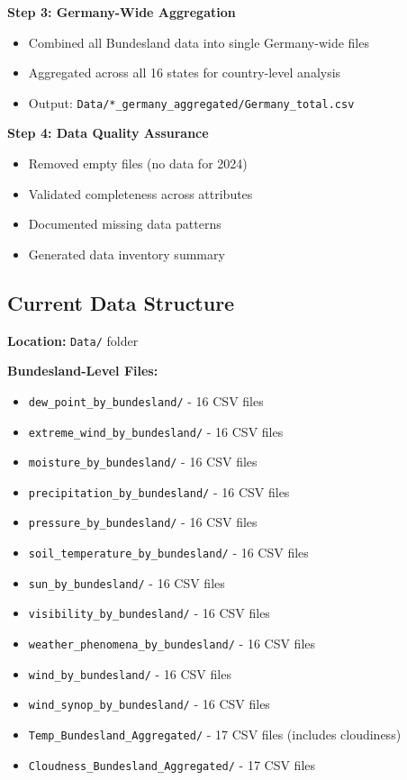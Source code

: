 \documentclass[11pt,a4paper]{article}
\begin{document}
\textbf{Step 3: Germany-Wide Aggregation}
\begin{itemize}
    \item Combined all Bundesland data into single Germany-wide files
    \item Aggregated across all 16 states for country-level analysis
    \item Output: \texttt{Data/*\_germany\_aggregated/Germany\_total.csv}
\end{itemize}

\textbf{Step 4: Data Quality Assurance}
\begin{itemize}
    \item Removed empty files (no data for 2024)
    \item Validated completeness across attributes
    \item Documented missing data patterns
    \item Generated data inventory summary
\end{itemize}

\subsection{Current Data Structure}

\textbf{Location:} \texttt{Data/} folder

\textbf{Bundesland-Level Files:}
\begin{itemize}
    \item \texttt{dew\_point\_by\_bundesland/} - 16 CSV files
    \item \texttt{extreme\_wind\_by\_bundesland/} - 16 CSV files
    \item \texttt{moisture\_by\_bundesland/} - 16 CSV files
    \item \texttt{precipitation\_by\_bundesland/} - 16 CSV files
    \item \texttt{pressure\_by\_bundesland/} - 16 CSV files
    \item \texttt{soil\_temperature\_by\_bundesland/} - 16 CSV files
    \item \texttt{sun\_by\_bundesland/} - 16 CSV files
    \item \texttt{visibility\_by\_bundesland/} - 16 CSV files
    \item \texttt{weather\_phenomena\_by\_bundesland/} - 16 CSV files
    \item \texttt{wind\_by\_bundesland/} - 16 CSV files
    \item \texttt{wind\_synop\_by\_bundesland/} - 16 CSV files
    \item \texttt{Temp\_Bundesland\_Aggregated/} - 17 CSV files (includes cloudiness)
    \item \texttt{Cloudness\_Bundesland\_Aggregated/} - 17 CSV files
\end{itemize}
\end{document}
